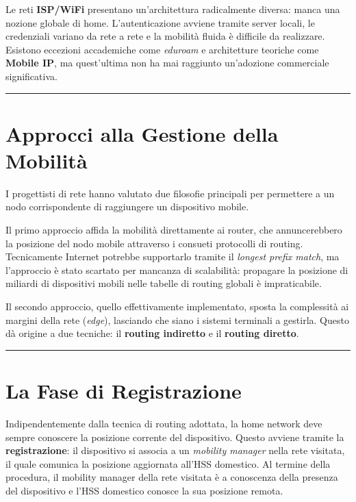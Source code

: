 \documentclass[
  italian,
  openany]{book}
\begin{document}
Le reti \textbf{ISP/WiFi} presentano un'architettura radicalmente
diversa: manca una nozione globale di home. L'autenticazione avviene
tramite server locali, le credenziali variano da rete a rete e la
mobilità fluida è difficile da realizzare. Esistono eccezioni
accademiche come \emph{eduroam} e architetture teoriche come
\textbf{Mobile IP}, ma quest'ultima non ha mai raggiunto un'adozione
commerciale significativa.

\begin{center}\rule{0.5\linewidth}{0.5pt}\end{center}

\section{Approcci alla Gestione della
Mobilità}\label{approcci-alla-gestione-della-mobilituxe0}

I progettisti di rete hanno valutato due filosofie principali per
permettere a un nodo corrispondente di raggiungere un dispositivo
mobile.

Il primo approccio affida la mobilità direttamente ai router, che
annuncerebbero la posizione del nodo mobile attraverso i consueti
protocolli di routing. Tecnicamente Internet potrebbe supportarlo
tramite il \emph{longest prefix match}, ma l'approccio è stato scartato
per mancanza di scalabilità: propagare la posizione di miliardi di
dispositivi mobili nelle tabelle di routing globali è impraticabile.

Il secondo approccio, quello effettivamente implementato, sposta la
complessità ai margini della rete (\emph{edge}), lasciando che siano i
sistemi terminali a gestirla. Questo dà origine a due tecniche: il
\textbf{routing indiretto} e il \textbf{routing diretto}.

\begin{center}\rule{0.5\linewidth}{0.5pt}\end{center}

\section{La Fase di Registrazione}\label{la-fase-di-registrazione}

Indipendentemente dalla tecnica di routing adottata, la home network
deve sempre conoscere la posizione corrente del dispositivo. Questo
avviene tramite la \textbf{registrazione}: il dispositivo si associa a
un \emph{mobility manager} nella rete visitata, il quale comunica la
posizione aggiornata all'HSS domestico. Al termine della procedura, il
mobility manager della rete visitata è a conoscenza della presenza del
dispositivo e l'HSS domestico conosce la sua posizione remota.
\end{document}
